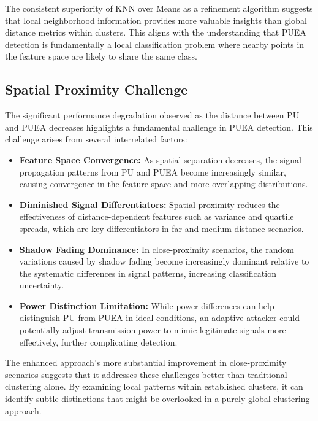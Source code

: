 The consistent superiority of KNN over Means as a refinement algorithm suggests that local neighborhood information provides more valuable insights than global distance metrics within clusters. This aligns with the understanding that PUEA detection is fundamentally a local classification problem where nearby points in the feature space are likely to share the same class.

\subsection{Spatial Proximity Challenge}

The significant performance degradation observed as the distance between PU and PUEA decreases highlights a fundamental challenge in PUEA detection. This challenge arises from several interrelated factors:

\begin{itemize}
    \item \textbf{Feature Space Convergence:} As spatial separation decreases, the signal propagation patterns from PU and PUEA become increasingly similar, causing convergence in the feature space and more overlapping distributions.
    
    \item \textbf{Diminished Signal Differentiators:} Spatial proximity reduces the effectiveness of distance-dependent features such as variance and quartile spreads, which are key differentiators in far and medium distance scenarios.
    
    \item \textbf{Shadow Fading Dominance:} In close-proximity scenarios, the random variations caused by shadow fading become increasingly dominant relative to the systematic differences in signal patterns, increasing classification uncertainty.
    
    \item \textbf{Power Distinction Limitation:} While power differences can help distinguish PU from PUEA in ideal conditions, an adaptive attacker could potentially adjust transmission power to mimic legitimate signals more effectively, further complicating detection.
\end{itemize}

The enhanced approach's more substantial improvement in close-proximity scenarios suggests that it addresses these challenges better than traditional clustering alone. By examining local patterns within established clusters, it can identify subtle distinctions that might be overlooked in a purely global clustering approach.


